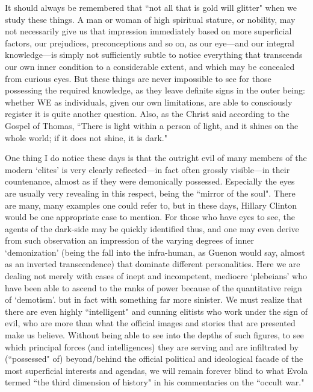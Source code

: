 \begin{footnotesize}
\begin{sffamily}
It should always be remembered that ``not all that is gold will glitter" when we study these things. A man or woman of high spiritual stature, or nobility, may not necessarily give us that impression immediately based on more superficial factors, our prejudices, preconceptions and so on, as our eye—and our integral knowledge—is simply not sufficiently subtle to notice everything that transcends our own inner condition to a considerable extent, and which may be concealed from curious eyes. But these things are never impossible to see for those possessing the required knowledge, as they leave definite signs in the outer being: whether WE as individuals, given our own limitations, are able to consciously register it is quite another question. Also, as the Christ said according to the Gospel of Thomas, ``There is light within a person of light, and it shines on the whole world; if it does not shine, it is dark."

One thing I do notice these days is that the outright evil of many members of the modern `elites' is very clearly reflected—in fact often grossly visible—in their countenance, almost as if they were demonically possessed. Especially the eyes are usually very revealing in this respect, being the ``mirror of the soul". There are many, many examples one could refer to, but in these days, Hillary Clinton would be one appropriate case to mention. For those who have eyes to see, the agents of the dark-side may be quickly identified thus, and one may even derive from such observation an impression of the varying degrees of inner `demonization' (being the fall into the infra-human, as Guenon would say, almost as an inverted transcendence) that dominate different personalities. Here we are dealing not merely with cases of inept and incompetent, mediocre `plebeians' who have been able to ascend to the ranks of power because of the quantitative reign of `demotism'. but in fact with something far more sinister. We must realize that there are even highly ``intelligent" and cunning elitists who work under the sign of evil, who are more than what the official images and stories that are presented make us believe. Without being able to see into the depths of such figures, to see which principal forces (and intelligences) they are serving and are infiltrated by (``possessed" of) beyond/behind the official political and ideological facade of the most superficial interests and agendas, we will remain forever blind to what Evola termed ``the third dimension of history" in his commentaries on the ``occult war."


\end{sffamily}
\end{footnotesize}

